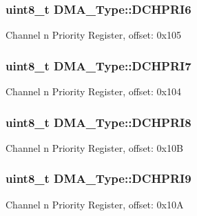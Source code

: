 \subsubsection[{\texorpdfstring{D\+C\+H\+P\+R\+I6}{DCHPRI6}}]{ uint8\+\_\+t D\+M\+A\+\_\+\+Type\+::\+D\+C\+H\+P\+R\+I6}\hypertarget{structDMA__Type_abbc2da10712e9c4ca6a00d8faa6ff6fa}{}\label{structDMA__Type_abbc2da10712e9c4ca6a00d8faa6ff6fa}
Channel n Priority Register, offset\+: 0x105 
\subsubsection[{\texorpdfstring{D\+C\+H\+P\+R\+I7}{DCHPRI7}}]{ uint8\+\_\+t D\+M\+A\+\_\+\+Type\+::\+D\+C\+H\+P\+R\+I7}\hypertarget{structDMA__Type_a6aa09d24a95848d451a7a8415bbede9e}{}\label{structDMA__Type_a6aa09d24a95848d451a7a8415bbede9e}
Channel n Priority Register, offset\+: 0x104 
\subsubsection[{\texorpdfstring{D\+C\+H\+P\+R\+I8}{DCHPRI8}}]{ uint8\+\_\+t D\+M\+A\+\_\+\+Type\+::\+D\+C\+H\+P\+R\+I8}\hypertarget{structDMA__Type_a66813716e63ebf054f73013d5e8e4365}{}\label{structDMA__Type_a66813716e63ebf054f73013d5e8e4365}
Channel n Priority Register, offset\+: 0x10B 
\subsubsection[{\texorpdfstring{D\+C\+H\+P\+R\+I9}{DCHPRI9}}]{ uint8\+\_\+t D\+M\+A\+\_\+\+Type\+::\+D\+C\+H\+P\+R\+I9}\hypertarget{structDMA__Type_ae1275238c5c1cea15e0850d662d1f30f}{}\label{structDMA__Type_ae1275238c5c1cea15e0850d662d1f30f}
Channel n Priority Register, offset\+: 0x10A 
